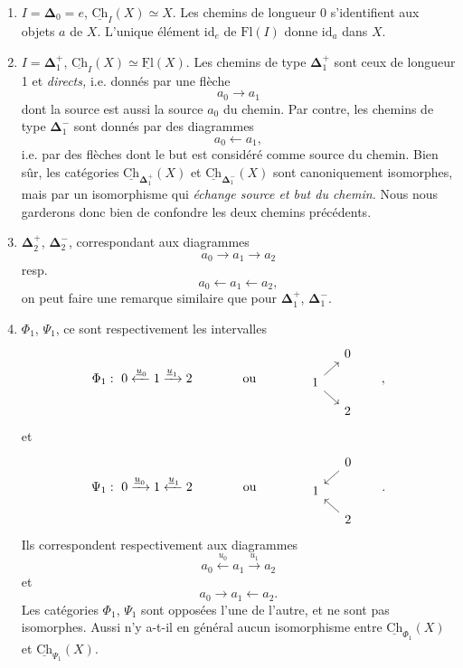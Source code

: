 \documentclass[11pt]{article}
\newcommand{\printedpage}[1]{\marginpar{\footnotesize p.~#1}}
\newcommand{\msp}[1]{\marginpar{\footnotesize [#1]}}
\newcommand{\Ch}{\underline{\mathrm{Ch}}}
\newcommand{\uFl}{\underline{\mathrm{Fl}}}
\newcommand{\bDelta}{\boldsymbol{\Delta}}
\begin{document}
\begin{enumerate}
\item[1.] $I = \bDelta_0 = e$, $\Ch_I(X) \simeq X$. Les chemins de longueur 0 s'identifient aux objets $a$ de $X$. L'unique élément $\mathrm{id}_e$ de $\mathrm{Fl}(I)$ donne $\mathrm{id}_a$ dans $X$.

\item[2.] $I = \bDelta_1^+$, $\Ch_I(X) \simeq \uFl(X)$. Les chemins de type $\bDelta_1^+$ sont ceux de longueur 1 et \textit{directs,} i.e. donnés par une flèche
\[
a_0 \longrightarrow a_1
\]
dont la source est aussi la source $a_0$ du chemin. Par contre, les chemins de type $\bDelta_1^-$ sont donnés par des diagrammes
\[
a_0 \longleftarrow a_1,
\]
i.e. par des flèches dont le but est considéré comme source du chemin. Bien sûr, les catégories $\Ch_{\bDelta_1^+}(X)$ et $\Ch_{\bDelta_1^-}(X)$ sont canoniquement isomorphes, mais par un isomorphisme qui \textit{échange source et but du chemin.} Nous nous garderons donc bien de confondre les deux chemins précédents.

\msp{page 16}

\item[3.] $\bDelta_2^+$, $\bDelta_2^-$, correspondant aux diagrammes
\[
a_0 \longrightarrow a_1 \longrightarrow a_2
\]
resp.
\[
a_0 \longleftarrow a_1 \longleftarrow a_2,
\]
on peut faire une remarque similaire que pour $\bDelta_1^+$, $\bDelta_1^-$.

\printedpage{11}

\item[4.] $\Phi_1$, $\Psi_1$, ce sont respectivement les intervalles
\[
\Phi_1 :\ 0 \xleftarrow{\underline{u}_0} 1 \xrightarrow{\underline{u}_1} 2 \qquad\qquad \text{ou} \qquad\qquad
\begin{tikzcd}[row sep=small, column sep=small]
 & 0 \\
1 \arrow[ur] \arrow[dr] & \\
 & 2
\end{tikzcd}
\qquad , %
\]
et
\[
\Psi_1 :\ 0 \xrightarrow{\underline{u}_0} 1 \xleftarrow{\underline{u}_1} 2 \qquad\qquad \text{ou} \qquad\qquad
\begin{tikzcd}[row sep=small, column sep=small]
 & 0 \arrow[dl] \\
1 & \\
 & 2 \arrow[ul]
\end{tikzcd}
\qquad .
\]
Ils correspondent respectivement aux diagrammes
\[
a_0 \xleftarrow{u_0} a_1 \xrightarrow{u_1} a_2
\]
et
\[
a_0 \longrightarrow a_1 \longleftarrow a_2.
\]
Les catégories $\Phi_1$, $\Psi_1$ sont opposées l'une de l'autre, et ne sont pas isomorphes. Aussi n'y a-t-il en général aucun isomorphisme entre $\Ch_{\Phi_1}(X)$ et $\Ch_{\Psi_1}(X)$.
\end{enumerate}
\end{document}
